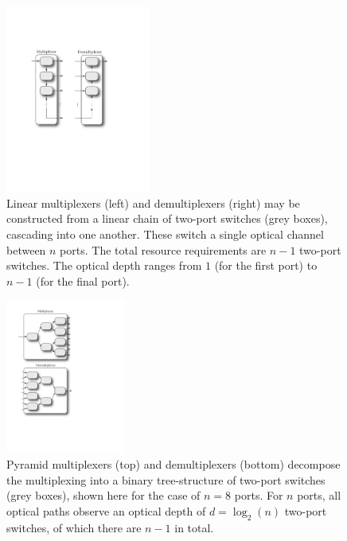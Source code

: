 \begin{figure}[!htbp]
\includegraphics[clip=true, width=0.425\textwidth]{linear_multiplexer}
\captionspacefig \caption{Linear multiplexers (left) and demultiplexers (right) may be constructed from a linear chain of two-port switches (grey boxes), cascading into one another. These switch a single optical channel between $n$ ports. The total resource requirements are \mbox{$n-1$} two-port switches. The optical depth ranges from $1$ (for the first port) to \mbox{$n-1$} (for the final port).} \label{fig:linear_multiplexer} 
\end{figure}

\begin{figure}[!htbp]
\includegraphics[clip=true, width=0.35\textwidth]{pyramid_multiplexer}
\captionspacefig \caption{Pyramid multiplexers (top) and demultiplexers (bottom) decompose the multiplexing into a binary tree-structure of two-port switches (grey boxes), shown here for the case of \mbox{$n=8$} ports. For $n$ ports, all optical paths observe an optical depth of \mbox{$d=\log_2(n)$} two-port switches, of which there are \mbox{$n-1$} in total.} \label{fig:pyramid_multiplexer} 
\end{figure}

